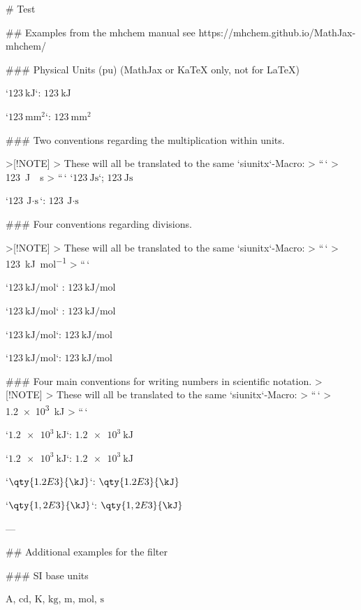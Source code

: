 \# Test

\#\# Examples from the mhchem manual see
https://mhchem.github.io/MathJax-mhchem/

\#\#\# Physical Units (pu) (MathJax or KaTeX only, not for LaTeX)

`\(\qty{123}{\kJ}\)`: \(\qty{123}{\kJ}\)

`\(\qty{123}{\mm\squared}\)`: \(\qty{123}{\mm\squared}\)

\#\#\# Two conventions regarding the multiplication within units.

\textgreater{[}!NOTE{]} \textgreater{} These will all be translated to
the same `siunitx`-Macro: \textgreater{} ``\,` \textgreater{}
123~J~\cdot~s \textgreater{} ``\,` `\(\qty{123}{\J \s}\)`;
\(\qty{123}{\J \s}\)

`\(\qty{123}{\J \cdot\s}\)`: \(\qty{123}{\J \cdot\s}\)

\#\#\# Four conventions regarding divisions.

\textgreater{[}!NOTE{]} \textgreater{} These will all be translated to
the same `siunitx`-Macro: \textgreater{} ``\,` \textgreater{}
123~kJ~mol\textsuperscript{−1} \textgreater{} ``\,`

`\(\qty{123}{\kJ \per\mol }\)` : \(\qty{123}{\kJ \per\mol }\)

`\(\qty{123}{\kJ \per\mol }\)` : \(\qty{123}{\kJ \per\mol }\)

`\(\qty{123}{\kJ \per\mol }\)`: \(\qty{123}{\kJ \per\mol }\)

`\(\qty{123}{\kJ \per\mol }\)`: \(\qty{123}{\kJ \per\mol }\)

\#\#\# Four main conventions for writing numbers in scientific notation.
\textgreater{[}!NOTE{]} \textgreater{} These will all be translated to
the same `siunitx`-Macro: \textgreater{} ``\,` \textgreater{}
1.2~×~10\textsuperscript{3}~kJ \textgreater{} ``\,`

`\(\qty{1.2e3}{\kJ}\)`: \(\qty{1.2e3}{\kJ}\)

`\(\qty{1,2e3}{\kJ}\)`: \(\qty{1,2e3}{\kJ}\)

`\(\qty{1.2E3}{\kJ}\)`: \(\qty{1.2E3}{\kJ}\)

`\(\qty{1,2E3}{\kJ}\)`: \(\qty{1,2E3}{\kJ}\)

---

\#\# Additional examples for the filter

\#\#\# SI base units

\(\unit{\A}\), \(\unit{\candela}\), \(\unit{\K}\), \(\unit{\kg}\),
\(\unit{\meter}\), \(\unit{\mol}\), \(\unit{\s}\)

